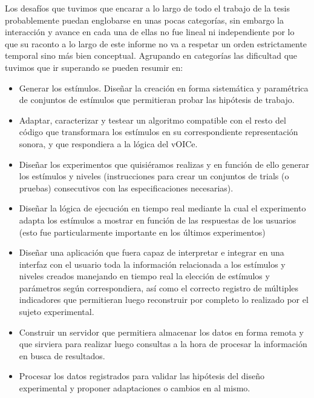 \documentclass{article}
\begin{document}
    Los desafíos que tuvimos que encarar a lo largo de todo el trabajo de la tesis probablemente puedan englobarse en unas pocas categorías, sin embargo la interacción y avance en cada una de ellas no fue lineal ni independiente por lo que su raconto a lo largo de este informe no va a respetar un orden estrictamente temporal sino más bien conceptual. Agrupando en categorías las dificultad que tuvimos que ir superando se pueden resumir en:
    
    \begin{itemize}
        \item Generar los estímulos. Diseñar la creación en forma sistemática y paramétrica de conjuntos de estímulos que permitieran probar las hipótesis de trabajo. 
        \item Adaptar, caracterizar y testear un algoritmo compatible con el resto del código que transformara los estímulos en su correspondiente representación sonora, y que respondiera a la lógica del vOICe. 
        \item Diseñar los experimentos que quisiéramos realizas y en función de ello generar los estímulos y niveles (instrucciones para crear un conjuntos de trials (o pruebas) consecutivos con las especificaciones necesarias).
        \item Diseñar la lógica de ejecución en tiempo real mediante la cual el experimento adapta los estímulos a mostrar en función de las respuestas de los usuarios (esto fue particularmente importante en los últimos experimentos)
        \item Diseñar una aplicación que fuera capaz de interpretar e integrar en una interfaz con el usuario toda la información relacionada a los estímulos y niveles creados manejando en tiempo real la elección de estímulos y parámetros según correspondiera, así como el correcto registro de múltiples indicadores que permitieran luego reconstruir por completo lo realizado por el sujeto experimental. 
        \item Construir un servidor que permitiera almacenar los datos en forma remota y que sirviera para realizar luego consultas a la hora de procesar la información en busca de resultados.
        \item Procesar los datos registrados para validar las hipótesis del diseño experimental y proponer adaptaciones o cambios en al mismo. 
    \end{itemize}
    
\end{document}
